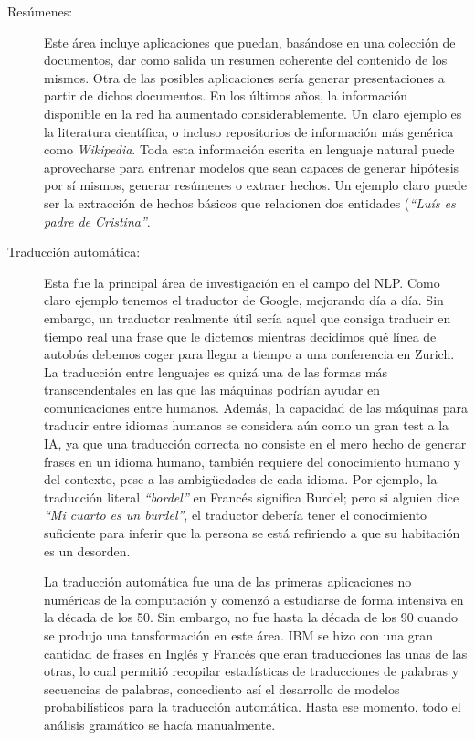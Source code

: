 \begin{description}\label{sec:nlpfields}
  \item[Resúmenes:] Este área incluye aplicaciones que puedan, basándose en una
    colección de documentos, dar como salida un resumen coherente del contenido
    de los mismos. Otra de las posibles aplicaciones sería generar
    presentaciones a partir de dichos documentos. En los últimos años, la
    información disponible en la red ha aumentado considerablemente. Un claro
    ejemplo es la literatura científica, o incluso repositorios de información
    más genérica como \emph{Wikipedia}. Toda esta información escrita en
    lenguaje natural puede aprovecharse para entrenar modelos que sean capaces
    de generar hipótesis por sí mismos, generar resúmenes o extraer hechos. Un
    ejemplo claro puede ser la extracción de hechos básicos que relacionen dos
    entidades (\emph{``Luís es padre de Cristina''}.
  \item[Traducción automática:] Esta fue la principal área de investigación en
    el campo del \ac{NLP}. Como claro ejemplo tenemos el traductor de Google,
    mejorando día a día. Sin embargo, un traductor realmente útil sería aquel
    que consiga traducir en tiempo real una frase que le dictemos mientras
    decidimos qué línea de autobús debemos coger para llegar a tiempo a una
    conferencia en Zurich. La traducción entre lenguajes es quizá una de las
    formas más transcendentales en las que las máquinas podrían ayudar en
    comunicaciones entre humanos. Además, la capacidad de las máquinas para
    traducir entre idiomas humanos se considera aún como un gran test a la
    \ac{IA}, ya que una traducción correcta no consiste en el mero hecho de
    generar frases en un idioma humano, también requiere del conocimiento humano
    y del contexto, pese a las ambigüedades de cada idioma. Por ejemplo, la
    traducción literal \emph{``bordel''} en Francés significa Burdel; pero si
    alguien dice \emph{``Mi cuarto es un burdel''}, el traductor debería tener
    el conocimiento suficiente para inferir que la persona se está refiriendo a
    que su habitación es un desorden.

    La traducción automática fue una de las primeras aplicaciones no numéricas
    de la computación y comenzó a estudiarse de forma intensiva en la década de
    los 50. Sin embargo, no fue hasta la década de los 90 cuando se produjo una
    tansformación en este área. IBM se hizo con una gran cantidad de frases en
    Inglés y Francés que eran traducciones las unas de las otras,
     lo cual permitió recopilar
    estadísticas de traducciones de palabras y secuencias de palabras,
    concediento así el desarrollo de modelos probabilísticos para la traducción
    automática. Hasta ese momento, todo el análisis gramático se hacía
    manualmente.


\end{description}
